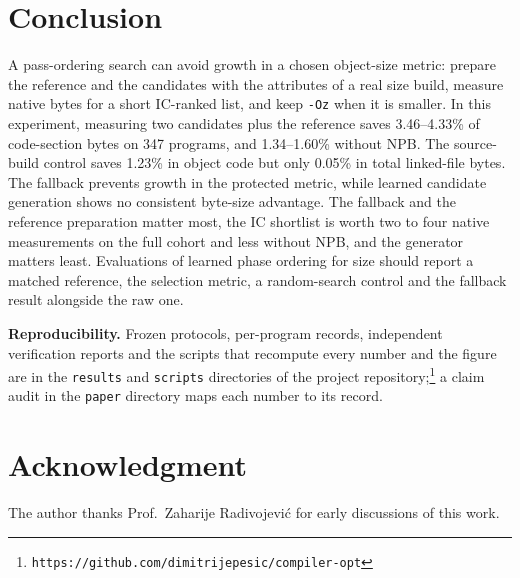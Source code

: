 \documentclass[conference,a4paper]{IEEEtran}
\begin{document}
\section{Conclusion}
A pass-ordering search can avoid growth in a chosen object-size metric:
prepare the reference and the candidates with
the attributes of a real size build, measure native bytes for a short
IC-ranked list, and keep \texttt{-Oz} when it is smaller. In this
experiment, measuring two candidates plus the reference saves
3.46--4.33\% of code-section bytes on 347 programs, and 1.34--1.60\%
without NPB. The source-build control saves 1.23\% in object code but
only 0.05\% in total linked-file bytes. The fallback prevents growth in
the protected metric, while learned candidate generation shows no
consistent byte-size advantage. The fallback and the reference
preparation matter most, the IC shortlist is worth two to four native
measurements on the full cohort and less without NPB, and the
generator matters least. Evaluations of learned
phase ordering for size should report a matched reference, the
selection metric, a random-search control and the fallback result
alongside the raw one.

\textbf{Reproducibility.} Frozen protocols, per-program records,
independent verification reports and the scripts that recompute every
number and the figure are in the \texttt{results} and \texttt{scripts}
directories of the project repository;\footnote{\raggedright
\texttt{https://github.com/dimitrijepesic/compiler-opt}} a claim audit
in the \texttt{paper} directory maps each number to its record.

\section*{Acknowledgment}
The author thanks Prof.~Zaharije Radivojevi\'c for early discussions of this
work.



\end{document}
